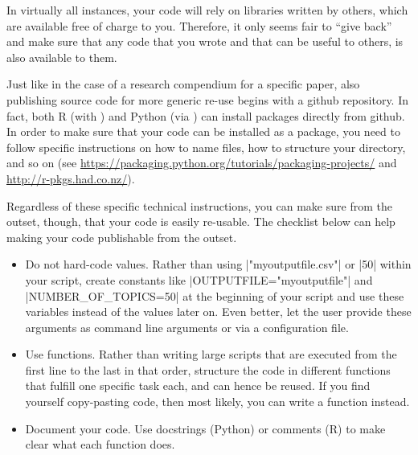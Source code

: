In virtually all instances, your code will rely on libraries written
by others, which are available free of charge to you. Therefore,
it only seems fair to ``give back'' and make sure that any code that
you wrote and that can be useful to others, is also available to them.

Just like in the case of a research compendium for a specific paper,
also publishing source code for more generic re-use begins with a
github repository. In fact, both R (with ) and Python
(via ) can install packages directly from github. In order
to make sure that your code can be installed as a package, you
need to follow specific instructions on how to name files, how to
structure your directory, and so on (see \url{https://packaging.python.org/tutorials/packaging-projects/}
and \url{http://r-pkgs.had.co.nz/}).

Regardless of these specific technical instructions, you can make
sure from the outset, though, that your code is easily re-usable.
The checklist below can help making your code publishable from the
outset.

\begin{itemize}
\item Do not hard-code values. Rather than using |"myoutputfile.csv"| or |50| within your script, create constants like |OUTPUTFILE="myoutputfile"| and |NUMBER_OF_TOPICS=50| at the beginning of your script and use these variables instead of the values later on. Even better, let the user provide these arguments as command line arguments or via a configuration file.
\item Use functions. Rather than writing large scripts that are executed from the first line to the last in that order, structure the code in different functions that fulfill one specific task each, and can hence be reused. If you find yourself copy-pasting code, then most likely, you can write a function instead.
\item Document your code. Use docstrings (Python) or comments (R) to make clear what each function does.
\end{itemize}


